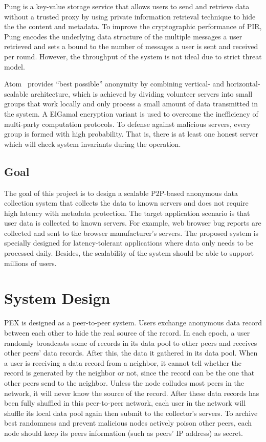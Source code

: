 \documentclass[twocolumn]{article}
\begin{document}
Pung \cite{angel_unobservable_2016} is a key-value storage service that allows users to send and retrieve data without a trusted proxy by using private information retrieval technique to hide the the content and metadata. To improve the cryptographic performance of PIR, Pung encodes the underlying data structure of the multiple messages a user retrieved and sets a bound to the number of messages a user is sent and received per round. However, the throughput of the system is not ideal due to strict threat model.

Atom~\cite{kwon_atom:_2017} provides ``best possible'' anonymity by combining vertical- and horizontal-scalable architecture, which is achieved by dividing volunteer servers into small groups that work locally and only process a small amount of data transmitted in the system. A ElGamal encryption variant is used to overcome the inefficiency of multi-party computation protocols. To defense against malicious servers, every group is formed with high probability. That is, there is at least one honest server which will check system invariants during the operation.

\subsection{Goal}
The goal of this project is to design a scalable P2P-based anonymous data collection system that collects the data to known servers and does not require high latency with metadata protection. The target application scenario is that user data is collected to known servers. For example, web browser bug reports are collected and sent to the browser manufacturer's servers. The proposed system is specially designed for latency-tolerant applications where data only needs to be processed daily. Besides, the scalability of the system should be able to support millions of users.

\section{System Design \label{sec:design}}
PEX is designed as a peer-to-peer system. Users exchange anonymous data record between each other to hide the real source of the record. In each epoch, a user randomly broadcasts some of records in its data pool to other peers and receives other peers' data records. After this, the data it gathered in its data pool. When a user is receiving a data record from a neighbor, it cannot tell whether the record is generated by the neighbor or not, since the record can be the one that other peers send to the neighbor. Unless the node colludes most peers in the network, it will never know the source of the record. After these data records has been fully shuffled in this peer-to-peer network, each user in the network will shuffle its local data pool again then submit to the collector's servers. To archive best randomness and prevent malicious nodes actively poison other peers, each node should keep its peers information (such as peers' IP address) as secret.
\end{document}
